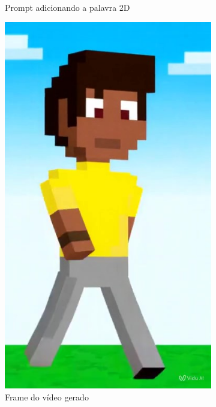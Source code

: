 \begin{figure}[htbp]
\begin{subfigure}{0.75\linewidth}
        \caption{\small Prompt adicionando a palavra 2D}
        \label{fig:vidu1c}
    \end{subfigure}
    \begin{subfigure}{0.2\linewidth}
        \includegraphics[width=1\linewidth]{figs/vidu/frame2.jpg}
        \caption{\small Frame do vídeo gerado}
        \label{fig:vidu1d}
    \end{subfigure}
    \begin{subfigure}{0.75\linewidth}
        \centering

\end{subfigure}
\end{figure}
